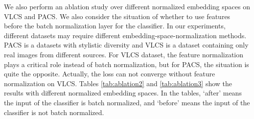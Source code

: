 \documentclass[a4paper,fleqn]{cas-dc}
\begin{document}
\begin{table}[h]
    \centering
    \caption{Ablation study over normalized embedding space on VLCS.}
    \label{tab:ablation3}
\end{table}
We also perform an ablation study over different normalized embedding spaces on VLCS and PACS. We also consider the situation of whether to use features before the batch normalization layer for the classifier. In our experiments, different datasets may require different embedding-space-normalization methods. PACS is a datasets with stylistic diversity and VLCS is a dataset containing only real images from different sources. For VLCS dataset, the feature normalization plays a critical role instead of batch normalization, but for PACS, the situation is quite the opposite. Actually, the loss can not converge without feature normalization on VLCS. Tables \ref{tab:ablation2} and \ref{tab:ablation3} show the results with different normalized embedding spaces. In the tables, `after' means the input of the classifier is batch normalized, and `before' means the input of the classifier is not batch normalized. 
\end{document}
